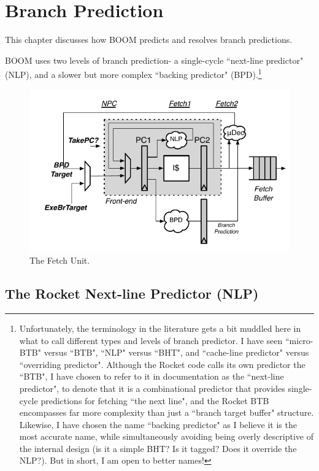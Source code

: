  
\chapter{Branch Prediction}\label{chapter:bpd}

This chapter discusses how BOOM predicts and resolves branch predictions.

BOOM uses two levels of branch prediction- a single-cycle ``next-line predictor" (NLP), and a slower but more complex ``backing predictor" (BPD).\footnote{Unfortunately, the terminology in the literature gets a bit muddled here in what to call different types and levels of branch predictor. I have seen ``micro-BTB" versus ``BTB", ``NLP" versus ``BHT", and ``cache-line predictor" versus ``overriding predictor". 
Although the Rocket code calls its own predictor the ``BTB", I have chosen to refer to it in documentation as the ``next-line predictor", to denote that it is a combinational predictor that provides single-cycle predictions for fetching ``the next line", and the Rocket BTB encompasses far more complexity than just a ``branch target buffer" structure.  Likewise, I have chosen the name ``backing predictor" as I believe it is the most accurate name, while simultaneously avoiding being overly descriptive of the internal design (is it a simple BHT? Is it tagged? Does it override the NLP?).
{\color{red} But in short, I am open to better names!}}



\begin{figure}[ht]
	\centering
	\centerline{\includegraphics[scale =1] {figures/frontend}}
	\caption{ \small The Fetch Unit.}
	\label{fig:fetch}
\end{figure}


\section{The Rocket Next-line Predictor (NLP)}

